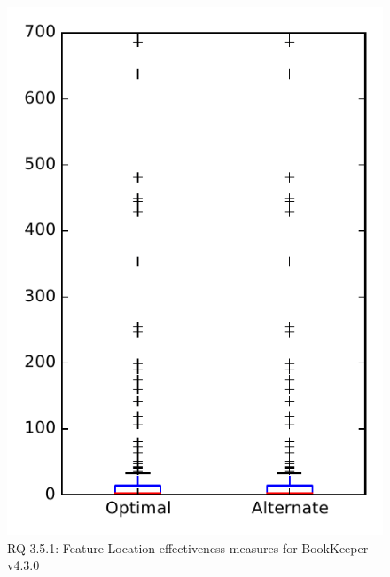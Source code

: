 
\begin{figure}
\centering
\includegraphics[height=0.4\textheight]{figures/combo/flt_rq1_bookkeeper}
\caption{RQ 3.5.1: Feature Location effectiveness measures for BookKeeper v4.3.0}
\label{fig:flt:rq1:bookkeeper}
\end{figure}
